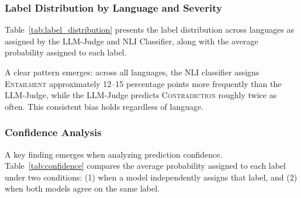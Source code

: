     \subsubsection{Label Distribution by Language and Severity}
    \label{sec:label_distribution}

    Table~\ref{tab:label_distribution} presents the label distribution across languages as assigned by the LLM-Judge and NLI Classifier, along with the average probability assigned to each label.

    \begin{table}[htbp]
    \centering
    \caption{Label Distribution and Average Confidence by Language}
    \label{tab:label_distribution}
    \end{table}

    A clear pattern emerges: across all languages, the NLI classifier assigns \textsc{Entailment} approximately 12--15 percentage points more frequently than the LLM-Judge, while the LLM-Judge predicts \textsc{Contradiction} roughly twice as often. This consistent bias holds regardless of language.

    \subsubsection{Confidence Analysis}

    A key finding emerges when analyzing prediction confidence. Table~\ref{tab:confidence} compares the average probability assigned to each label under two conditions: (1) when a model independently assigns that label, and (2) when both models agree on the same label.

